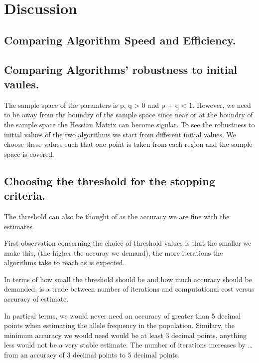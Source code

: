 \documentclass[]{article}
\begin{document}
\section{Discussion}\label{discussion}

\subsection{Comparing Algorithm Speed and
Efficiency.}\label{comparing-algorithm-speed-and-efficiency.}

\subsection{Comparing Algorithms' robustness to initial
vaules.}\label{comparing-algorithms-robustness-to-initial-vaules.}

The sample space of the paramters is p, q \textgreater{} 0 and p + q
\textless{} 1. However, we need to be away from the boundry of the
sample space since near or at the boundry of the sample space the
Hessian Matrix can become sigular. To see the robustness to initial
values of the two algorithms we start from different initial values. We
choose these values such that one point is taken from each region and
the sample space is covered.

\subsection{Choosing the threshold for the stopping
criteria.}\label{choosing-the-threshold-for-the-stopping-criteria.}

The threshold can also be thought of as the accuracy we are fine with
the estimates.

First observation concerning the choice of threshold values is that the
smaller we make this, (the higher the accuray we demand), the more
iterations the algorithms take to reach as is expected.

In terms of how small the threshold should be and how much accuracy
should be demanded, is a trade between number of iterations and
computational cost versus accuracy of estimate.

In partical terms, we would never need an accuracy of greater than 5
decimal points when estimating the allele frequency in the population.
Similary, the minimum accuracy we would need would be at least 3 decimal
points, anything less would not be a very stable estimate. The number of
iterations increases by \ldots{} from an accuracy of 3 decimal points to
5 decimal points.
\end{document}
